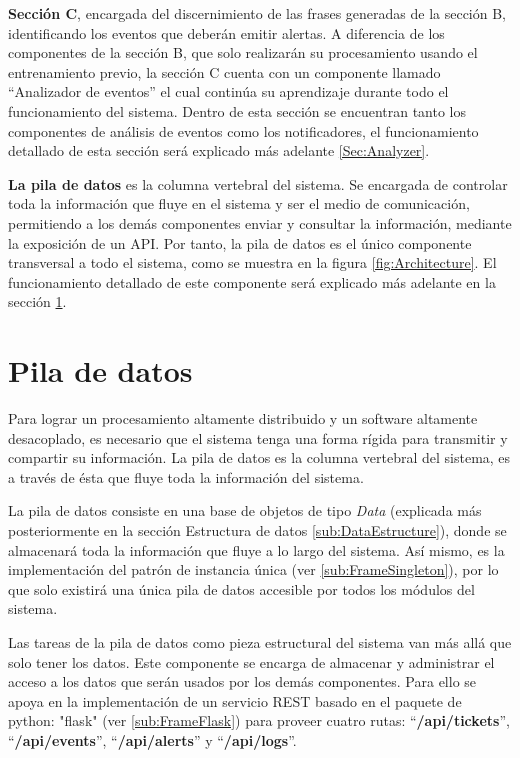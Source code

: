     \textbf{Sección C}, encargada del discernimiento de las frases generadas de la sección B, identificando los eventos que deberán emitir alertas. A diferencia de los componentes de la sección B, que solo realizarán su procesamiento usando el entrenamiento previo, la sección C cuenta con un componente llamado “Analizador de eventos” el cual continúa su aprendizaje durante todo el funcionamiento del sistema. Dentro de esta sección se encuentran tanto los componentes de análisis de eventos como los notificadores, el funcionamiento detallado de esta sección será explicado más adelante \ref{Sec:Analyzer}.

    \textbf{La pila de datos} es la columna vertebral del sistema. Se encargada de controlar toda la información que fluye en el sistema y ser el medio de comunicación, permitiendo a los demás componentes enviar y consultar la información, mediante la exposición de un API. Por tanto, la pila de datos es el único componente transversal a todo el sistema, como se muestra en la figura \ref{fig:Architecture}. El funcionamiento detallado de este componente será explicado más adelante en la sección \ref{Sec:DataPool}. 
    
    \newpage
  
\section{Pila de datos}
\label{Sec:DataPool}
    Para lograr un procesamiento altamente distribuido y un software altamente desacoplado, es necesario que el sistema tenga una forma rígida para transmitir y compartir su información. La pila de datos es la columna vertebral del sistema, es a través de ésta que fluye toda la información del sistema.
    
    La pila de datos consiste en una base de objetos de tipo \textit{Data} (explicada más posteriormente en la sección Estructura de datos \ref{sub:DataEstructure}), donde se almacenará toda la información que fluye a lo largo del sistema. Así mismo, es la implementación del patrón de instancia única (ver \ref{sub:FrameSingleton}), por lo que solo existirá una única pila de datos accesible por todos los módulos del sistema.
        
    Las tareas de la pila de datos como pieza estructural del sistema van más allá que solo tener los datos. Este componente se encarga de almacenar y administrar el acceso a los datos que serán usados por los demás componentes. Para ello se apoya en la implementación de un servicio REST basado en el paquete de python: "flask" (ver \ref{sub:FrameFlask}) para proveer cuatro rutas: ``\textbf{/api/tickets}'', ``\textbf{/api/events}'', ``\textbf{/api/alerts}'' y ``\textbf{/api/logs}''. 
    
